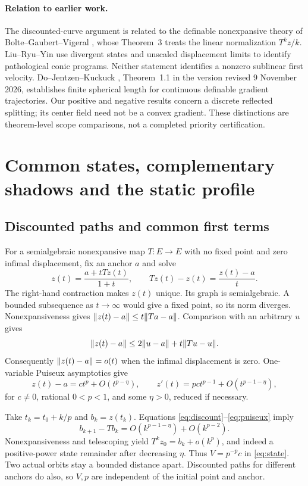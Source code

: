 \documentclass[11pt]{article}
\theoremstyle{remark}\newtheorem{remark}[theorem]{Remark}
\numberwithin{equation}{section}
\begin{document}
\paragraph{Relation to earlier work.}
The discounted-curve argument is related to the definable nonexpansive theory of Bolte--Gaubert--Vigeral \cite{BGV}, whose Theorem~3 treats the linear normalization $T^kz/k$. Liu--Ryu--Yin \cite{LRY} use divergent states and unscaled displacement limits to identify pathological conic programs. Neither statement identifies a nonzero sublinear first velocity. Do--Jentzen--Kuckuck \cite{DJK}, Theorem~1.1 in the version revised 9 November 2026, establishes finite spherical length for continuous definable gradient trajectories. Our positive and negative results concern a discrete reflected splitting; its center field need not be a convex gradient. These distinctions are theorem-level scope comparisons, not a completed priority certification.

\section{Common states, complementary shadows and the static profile}\label{sec:state}
\subsection{Discounted paths and common first terms}
For a semialgebraic nonexpansive map $T:E\to E$ with no fixed point and zero infimal displacement, fix an anchor $a$ and solve
\begin{equation}\label{eq:discount}
 z(t)=\frac{a+tTz(t)}{1+t},\qquad Tz(t)-z(t)=\frac{z(t)-a}{t}.
\end{equation}
The right-hand contraction makes $z(t)$ unique. Its graph is semialgebraic. A bounded subsequence as $t\to\infty$ would give a fixed point, so its norm diverges. Nonexpansiveness gives $\lVert z(t)-a\rVert\leq t\lVert Ta-a\rVert$. Comparison with an arbitrary $u$ gives
\[
 \lVert z(t)-a\rVert\leq2\lVert u-a\rVert+t\lVert Tu-u\rVert.
\]
Consequently $\lVert z(t)-a\rVert=o(t)$ when the infimal displacement is zero. One-variable Puiseux asymptotics give
\begin{equation}\label{eq:puiseux}
 z(t)-a=ct^p+O(t^{p-\eta}),\qquad
 z'(t)=pct^{p-1}+O(t^{p-1-\eta}),
\end{equation}
for $c\ne0$, rational $0<p<1$, and some $\eta>0$, reduced if necessary.

Take $t_k=t_0+k/p$ and $b_k=z(t_k)$. Equations \eqref{eq:discount}--\eqref{eq:puiseux} imply
\[
 b_{k+1}-Tb_k=O(k^{p-1-\eta})+O(k^{p-2}).
\]
Nonexpansiveness and telescoping yield $T^kz_0=b_k+o(k^p)$, and indeed a positive-power state remainder after decreasing $\eta$. Thus $V=p^{-p}c$ in \eqref{eq:state}. Two actual orbits stay a bounded distance apart. Discounted paths for different anchors do also, so $V,p$ are independent of the initial point and anchor.
\end{document}
